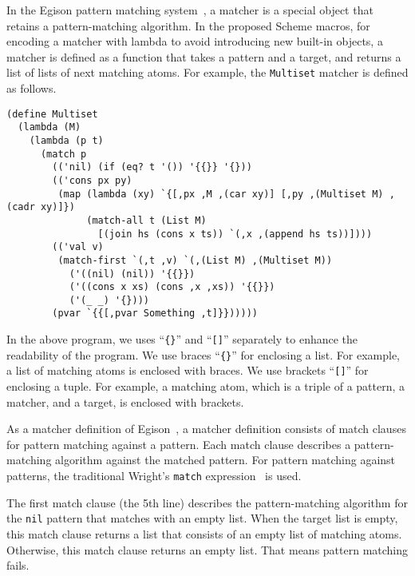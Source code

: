 \documentclass[acmlarge]{acmart}
\begin{document}
In the Egison pattern matching system~\cite{egi2018aplas}, a matcher is a special object that retains a pattern-matching algorithm.
In the proposed Scheme macros, for encoding a matcher with lambda to avoid introducing new built-in objects, a matcher is defined as a function that takes a pattern and a target, and returns a list of lists of next matching atoms.
For example, the \texttt{Multiset} matcher is defined as follows.

\begin{lstlisting}[language=egison]
(define Multiset
  (lambda (M)
    (lambda (p t)
      (match p
        (('nil) (if (eq? t '()) '{{}} '{}))
        (('cons px py)
         (map (lambda (xy) `{[,px ,M ,(car xy)] [,py ,(Multiset M) ,(cadr xy)]})
              (match-all t (List M)
                [(join hs (cons x ts)) `(,x ,(append hs ts))])))
        (('val v)
         (match-first `(,t ,v) `(,(List M) ,(Multiset M))
           ('((nil) (nil)) '{{}})
           ('((cons x xs) (cons ,x ,xs)) '{{}})
           ('(_ _) '{})))
        (pvar `{{[,pvar Something ,t]}})))))
\end{lstlisting}

In the above program, we uses ``\texttt{\{\}}'' and ``\texttt{[]}'' separately to enhance the readability of the program.
We use braces ``\texttt{\{\}}'' for enclosing a list.
For example, a list of matching atoms is enclosed with braces.
We use brackets ``\texttt{[]}'' for enclosing a tuple.
For example, a matching atom, which is a triple of a pattern, a matcher, and a target, is enclosed with brackets.

As a matcher definition of Egison~\cite{egi2018aplas}, a matcher definition consists of match clauses for pattern matching against a pattern.
Each match clause describes a pattern-matching algorithm against the matched pattern.
For pattern matching against patterns, the traditional Wright's \texttt{match} expression~\cite{wright1993pattern} is used.

The first match clause (the 5th line) describes the pattern-matching algorithm for the \texttt{nil} pattern that matches with an empty list.
When the target list is empty, this match clause returns a list that consists of an empty list of matching atoms.
Otherwise, this match clause returns an empty list.
That means pattern matching fails.
\end{document}

